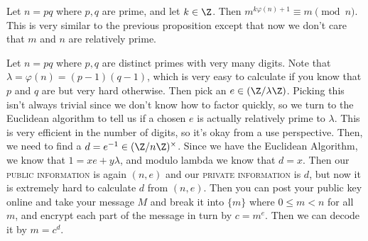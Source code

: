 \begin{proposition}
Let $n = pq$ where $p,q$ are prime, and let $k \in \Z$. Then $m^{k \varphi(n) + 1} \equiv m \pmod{n}$. This is very similar to the previous proposition except that now we don't care that $m$ and $n$ are relatively prime.
\end{proposition}

\begin{theorem}[RSA]
Let $n = pq$ where $p,q$ are distinct primes with very many digits. Note that $\lambda = \varphi(n) = (p-1)(q-1)$, which is very easy to calculate if you know that $p$ and $q$ are but very hard otherwise. Then pick an $e \in (\Z/\lambda\Z)$. Picking this isn't always trivial since we don't know how to factor quickly, so we turn to the Euclidean algorithm to tell us if a chosen $e$ is actually relatively prime to $\lambda$. This is very efficient in the number of digits, so it's okay from a use perspective. Then, we need to find a $d = e^{-1} \in (\Z/n\Z)^\times$. Since we have the Euclidean Algorithm, we know that $1 = xe + y\lambda$, and modulo lambda we know that $d = x$. Then our \textsc{public information} is again $(n,e)$ and our \textsc{private information} is $d$, but now it is extremely hard to calculate $d$ from $(n,e)$. Then you can post your public key online and take your message $M$ and break it into $\{m\}$ where $0 \leq m < n$ for all $m$, and encrypt each part of the message in turn by $c = m^e$. Then we can decode it by $m = c^d$.
\end{theorem}